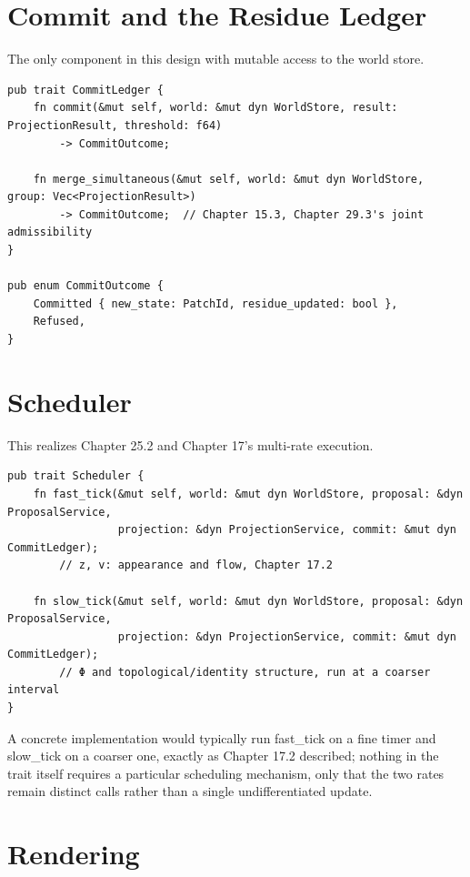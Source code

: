 \section{Commit and the Residue Ledger}

The only component in this design with mutable access to the world store.

\begin{Verbatim}[breaklines=true, breaksymbolleft={}, fontsize=\small]
pub trait CommitLedger {
    fn commit(&mut self, world: &mut dyn WorldStore, result: ProjectionResult, threshold: f64)
        -> CommitOutcome;

    fn merge_simultaneous(&mut self, world: &mut dyn WorldStore, group: Vec<ProjectionResult>)
        -> CommitOutcome;  // Chapter 15.3, Chapter 29.3's joint admissibility
}

pub enum CommitOutcome {
    Committed { new_state: PatchId, residue_updated: bool },
    Refused,
}
\end{Verbatim}

\section{Scheduler}

This realizes Chapter 25.2 and Chapter 17's multi-rate execution.

\begin{Verbatim}[breaklines=true, breaksymbolleft={}, fontsize=\small]
pub trait Scheduler {
    fn fast_tick(&mut self, world: &mut dyn WorldStore, proposal: &dyn ProposalService,
                 projection: &dyn ProjectionService, commit: &mut dyn CommitLedger);
        // z, v: appearance and flow, Chapter 17.2

    fn slow_tick(&mut self, world: &mut dyn WorldStore, proposal: &dyn ProposalService,
                 projection: &dyn ProjectionService, commit: &mut dyn CommitLedger);
        // Φ and topological/identity structure, run at a coarser interval
}
\end{Verbatim}

A concrete implementation would typically run fast\_tick on a fine timer and slow\_tick on a coarser one, exactly as Chapter 17.2 described; nothing in the trait itself requires a particular scheduling mechanism, only that the two rates remain distinct calls rather than a single undifferentiated update.

\section{Rendering}

